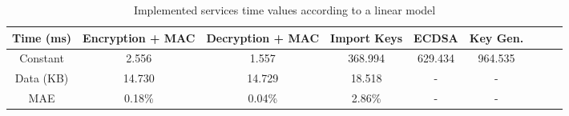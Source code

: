 \begin{table}[h!]
\centering
\def\arraystretch{1.5}
\begin{tabular}{|c|c|c|c|c|c|c|c|c|}
\hline
	Time (ms) & Encryption + MAC & Decryption + MAC & Import Keys & ECDSA & Key Gen. \\ \hline
	Constant  & 2.556  & 1.557   & 368.994 & 629.434 & 964.535 \\ \hline
	Data (KB) & 14.730  & 14.729  & 18.518  & - & - \\ \hline
	MAE	  & 0.18\% & 0.04\%  & 2.86\%  & - & - \\ \hline
\end{tabular}
\caption{Implemented services time values according to a linear model}
\label{tab:services-model}
\end{table}
